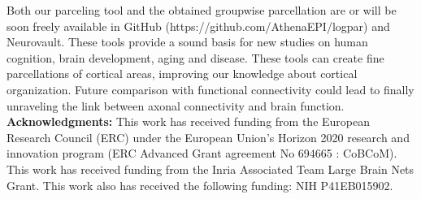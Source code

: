 Both our parceling tool and the obtained groupwise parcellation are or will
be soon freely available in GitHub (https://github.com/AthenaEPI/logpar) and
Neurovault. These tools provide a 
sound basis for new studies on human cognition, brain development, aging 
and disease. These tools can create fine parcellations of cortical areas, 
improving our knowledge about cortical organization. Future comparison with 
functional connectivity could lead to finally unraveling the link between axonal
connectivity and brain function. \\

{\noindent \small
\textbf{Acknowledgments:} This work has received funding from the European
Research Council (ERC) under the European Union's Horizon 2020 research and
innovation program (ERC Advanced Grant agreement No 694665 : CoBCoM). This
work has received funding from the Inria Associated Team Large Brain Nets Grant.
This work also has received the following funding: NIH P41EB015902.}
%
%
%
